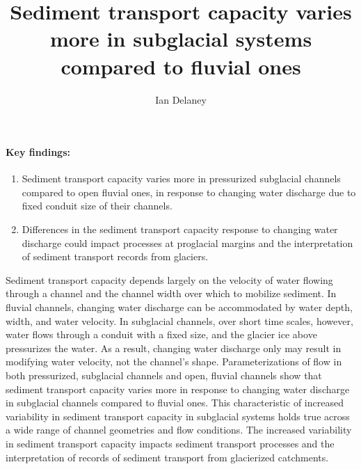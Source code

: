 \documentclass[11pt]{article}
\author[1]{Ian Delaney}
\affil[1]{Institut des dynamiques de la surface terrestre (IDYST), Universit\'{e} de Lausanne, B\^{a}timent G\'{e}opolis, CH-1015 Lausanne}
\title{Sediment transport capacity varies more in subglacial systems compared to fluvial ones}
\begin{document}
\maketitle

\paragraph{Key findings:}
\begin{enumerate}
\item Sediment transport capacity varies more in pressurized subglacial channels compared to open fluvial ones, in response to changing water discharge due to fixed conduit size of their channels.
\item Differences in the sediment transport capacity response to changing water discharge could impact processes at proglacial margins and the interpretation of sediment transport records from glaciers. 
\end{enumerate}

\abstract %
Sediment transport capacity depends largely on the velocity of water flowing through a channel and the channel width over which to mobilize sediment.
In fluvial channels, changing water discharge can be accommodated by water depth, width, and water velocity.
In subglacial channels, over short time scales, however, water flows through a conduit with a fixed size, and the glacier ice above pressurizes the water.
As a result, changing water discharge only may result in modifying water velocity, not the channel's shape.
Parameterizations of flow in both pressurized, subglacial channels and  open, fluvial channels show that sediment transport capacity varies  more in response to changing water discharge in subglacial channels compared to fluvial ones.
This characteristic of increased variability in sediment transport capacity in subglacial systems holds true  across a wide range of channel geometries and flow conditions.
The increased variability in sediment transport capacity impacts sediment transport processes and the interpretation of records of sediment transport from glacierized catchments.

\vspace{0.5cm}
\end{document}
